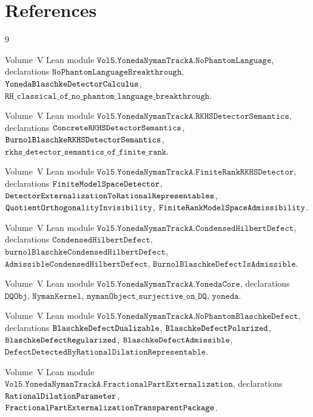 \documentclass[12pt]{article}
\theoremstyle{plain}
\theoremstyle{definition}
\theoremstyle{remark}
\begin{document}
\section{References}
\label{sec:references}

\begin{thebibliography}{9}

Volume~V Lean module
\(\mathtt{Vol5.YonedaNymanTrackA.NoPhantomLanguage}\), declarations
\(\mathtt{NoPhantomLanguageBreakthrough}\),
\(\mathtt{Yoneda\-Blaschke\-Detector\-Calculus}\),
\(\mathtt{RH\_classical\_of\_no\_phantom\_language\_breakthrough}\).

Volume~V Lean module
\(\mathtt{Vol5.YonedaNymanTrackA.RKHSDetectorSemantics}\), declarations
\(\mathtt{Concrete\-RKHS\-Detector\-Semantics}\),
\(\mathtt{Burnol\-Blaschke\-RKHS\-Detector\-Semantics}\),
\(\mathtt{rkhs\_detector\_semantics\_of\_finite\_rank}\).

Volume~V Lean module
\(\mathtt{Vol5.YonedaNymanTrackA.FiniteRankRKHSDetector}\), declarations
\(\mathtt{Finite\-Model\-Space\-Detector}\),
\(\mathtt{Detector\-Externalization\-To\-Rational\-Representables}\),
\(\mathtt{Quotient\-Orthogonality\-Invisibility}\),
\(\mathtt{Finite\-Rank\-Model\-Space\-Admissibility}\).

Volume~V Lean module
\(\mathtt{Vol5.YonedaNymanTrackA.CondensedHilbertDefect}\), declarations
\(\mathtt{CondensedHilbertDefect}\),
\(\mathtt{burnolBlaschkeCondensedHilbertDefect}\),
\(\mathtt{AdmissibleCondensedHilbertDefect}\),
\(\mathtt{BurnolBlaschkeDefectIsAdmissible}\).

Volume~V Lean module
\(\mathtt{Vol5.YonedaNymanTrackA.YonedaCore}\), declarations
\(\mathtt{DQObj}\), \(\mathtt{NymanKernel}\),
\(\mathtt{nymanObject\_surjective\_on\_DQ}\), \(\mathtt{yoneda}\).

Volume~V Lean module
\(\mathtt{Vol5.YonedaNymanTrackA.NoPhantomBlaschkeDefect}\), declarations
\(\mathtt{Blaschke\-Defect\-Dualizable}\),
\(\mathtt{Blaschke\-Defect\-Polarized}\),
\(\mathtt{Blaschke\-Defect\-Regularized}\),
\(\mathtt{Blaschke\-Defect\-Admissible}\),
\(\mathtt{DefectDetectedByRationalDilationRepresentable}\).

Volume~V Lean module
\(\mathtt{Vol5.YonedaNymanTrackA.FractionalPartExternalization}\),
declarations \(\mathtt{Rational\-Dilation\-Parameter}\),
\(\mathtt{Fractional\-Part\-Externalization\-Trans\-parent\-Pa\-cka\-ge}\).


\end{thebibliography}
\end{document}

